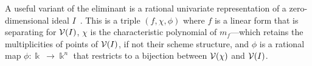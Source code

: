 A useful variant of the eliminant is a rational univariate representation of a zero-dimension\-al ideal $I$~\cite[???]{BPR}.
This is a triple $(f,\chi,\phi)$ where $f$ is a linear form that is separating for $\mathcal{V}(I)$, $\chi$ is the characteristic
polynomial of $m_f$---which retains the multiplicities of points of $\mathcal{V}(I)$, if not their scheme structure, and $\phi$
is a rational map $\phi\colon\Bbbk\ \to\Bbbk^n$ that restricts to a bijection between $\mathcal{V}(\chi)$ and $\mathcal{V}(I)$.
%
\begin{leftbar}

\end{leftbar}
%
